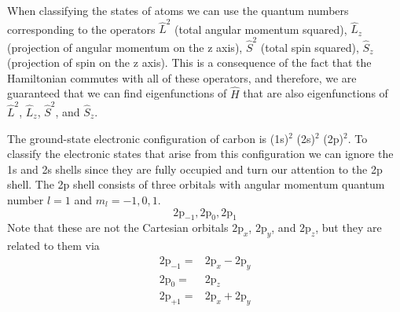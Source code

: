 \documentclass[../Main/chem532-notes.tex]{subfiles}
\begin{document}
\begin{example}
When classifying the states of atoms we can use the quantum numbers corresponding to the operators $\hat{L}^2$ (total angular momentum squared), $\hat{L}_z$ (projection of angular momentum on the z axis), $\hat{S}^2$ (total spin squared), $\hat{S}_z$ (projection of spin on the z axis).
This is a consequence of the fact that the Hamiltonian commutes with all of these operators, and therefore, we are guaranteed that we can find eigenfunctions of $\hat{H}$ that are also eigenfunctions of $\hat{L}^2$, $\hat{L}_z$, $\hat{S}^2$, and $\hat{S}_z$.


The ground-state electronic configuration of carbon is (1s)$^2$ (2s)$^2$ (2p)$^2$.
To classify the electronic states that arise from this configuration we can ignore the 1s and 2s shells since they are fully occupied and turn our attention to the 2p shell.
The 2p shell consists of three orbitals with angular momentum quantum number $l = 1$ and $m_l= -1,0,1$.
\begin{equation}
2\mathrm{p}_{-1}, 2\mathrm{p}_{0}, 2\mathrm{p}_{1}
\end{equation}
Note that these are not the Cartesian orbitals $\mathrm{2p}_{x}$, $\mathrm{2p}_{y}$, and $\mathrm{2p}_{z}$, but they are related to them via
\begin{equation}
\begin{split}
\mathrm{2p}_{-1} = &  \mathrm{2p}_{x} - \mathrm{2p}_{y} \\
\mathrm{2p}_{0} = & \mathrm{2p}_{z} \\
\mathrm{2p}_{+1} = & \mathrm{2p}_{x} + \mathrm{2p}_{y}
\end{split}
\end{equation}



\end{example}
\end{document}
